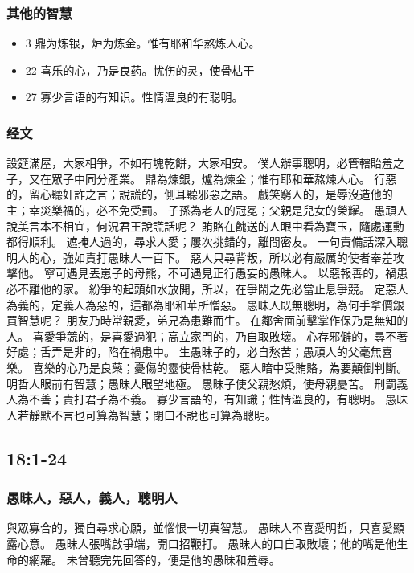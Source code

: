 \subsubsection{其他的智慧}
\begin{itemize}
\itemsep-.45em 
\item 3 鼎为炼银，炉为炼金。惟有耶和华熬炼人心。
\item 22 喜乐的心，乃是良药。忧伤的灵，使骨枯干
\item 27 寡少言语的有知识。性情温良的有聪明。
\end{itemize}

\subsubsection{经文}
設筵滿屋，大家相爭，不如有塊乾餅，大家相安。
僕人辦事聰明，必管轄貽羞之子，又在眾子中同分產業。
鼎為煉銀，爐為煉金；惟有耶和華熬煉人心。
行惡的，留心聽奸詐之言；說謊的，側耳聽邪惡之語。
戲笑窮人的，是辱沒造他的主；幸災樂禍的，必不免受罰。
子孫為老人的冠冕；父親是兒女的榮耀。
愚頑人說美言本不相宜，何況君王說謊話呢？
賄賂在餽送的人眼中看為寶玉，隨處運動都得順利。
遮掩人過的，尋求人愛；屢次挑錯的，離間密友。
一句責備話深入聰明人的心，強如責打愚昧人一百下。
惡人只尋背叛，所以必有嚴厲的使者奉差攻擊他。
寧可遇見丟崽子的母熊，不可遇見正行愚妄的愚昧人。
以惡報善的，禍患必不離他的家。
紛爭的起頭如水放開，所以，在爭鬧之先必當止息爭競。
定惡人為義的，定義人為惡的，這都為耶和華所憎惡。
愚昧人既無聰明，為何手拿價銀買智慧呢？
朋友乃時常親愛，弟兄為患難而生。
在鄰舍面前擊掌作保乃是無知的人。
喜愛爭競的，是喜愛過犯；高立家門的，乃自取敗壞。
心存邪僻的，尋不著好處；舌弄是非的，陷在禍患中。
生愚昧子的，必自愁苦；愚頑人的父毫無喜樂。
喜樂的心乃是良藥；憂傷的靈使骨枯乾。
惡人暗中受賄賂，為要顛倒判斷。
明哲人眼前有智慧；愚昧人眼望地極。
愚昧子使父親愁煩，使母親憂苦。
刑罰義人為不善；責打君子為不義。
寡少言語的，有知識；性情溫良的，有聰明。
愚昧人若靜默不言也可算為智慧；閉口不說也可算為聰明。


\subsection{  18:1-24}
\subsubsection{愚昧人，惡人，義人，聰明人 }
與眾寡合的，獨自尋求心願，並惱恨一切真智慧。
愚昧人不喜愛明哲，只喜愛顯露心意。
愚昧人張嘴啟爭端，開口招鞭打。
愚昧人的口自取敗壞；他的嘴是他生命的網羅。
未曾聽完先回答的，便是他的愚昧和羞辱。

